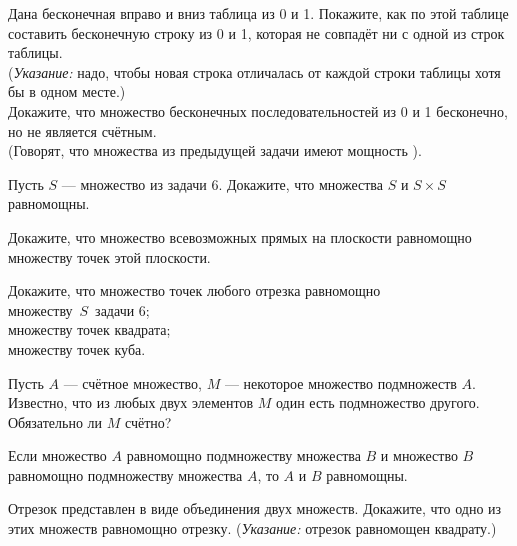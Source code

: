 \documentclass[a4paper,12pt]{article}
\begin{document}
 Дана бесконечная вправо и вниз таблица из 0 и 1.
Покажите, как по этой таблице составить бесконечную строку из 0 и 1,
которая не совпад\"ет ни с одной из строк таблицы.\\
{\footnotesize ({\em Указание:} надо, чтобы новая строка отличалась
от каждой строки таблицы хотя бы в одном месте.)}\\
Докажите, что
множество бесконечных последовательностей из 0 и 1
 бесконечно, но не является сч\"етным.\\
(Говорят, что множества из предыдущей задачи
имеют мощность ).


Пусть $S$ --- множество из задачи 6. Докажите, что
множества $S$ и $S\times S$ равномощны.

Докажите, что множество всевозможных
прямых на %
плоскости
равномощно множеству точек этой плоскости.

Докажите, что множество точек любого отрезка %
равномощно\\
множеству~$S$~зада\-чи 6;\\
%
множеству точек квадрата;\\ %
множеству точек куба.


 Пусть $A$ --- сч\"етное множество,
$M$ --- некоторое множество подмножеств $A$. Известно, что из
любых двух элементов $M$ один есть подмножество другого.
Обязательно ли $M$ сч\"етно?


Если множество $A$ равномощно %
подмножеству множества $B$ и множество $B$ равномощно %
подмножеству множества $A$, то %
$A$ и $B$ равномощны.

Отрезок представлен в виде объединения двух множеств.
Докажите, что одно из этих множеств
равномощно отрезку.
{\footnotesize ({\em Указание:} отрезок равномощен квадрату.)}
\end{document}
